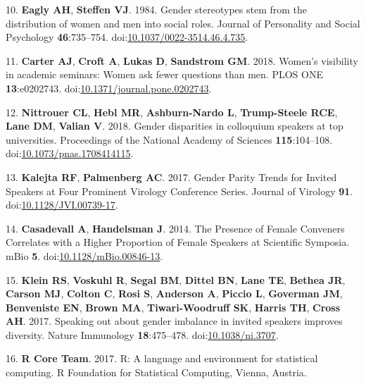 \documentclass[10pt,]{article}
\begin{document}
\hypertarget{ref-Eagly1984}{}
10. \textbf{Eagly AH}, \textbf{Steffen VJ}. 1984. Gender stereotypes
stem from the distribution of women and men into social roles. Journal
of Personality and Social Psychology \textbf{46}:735--754.
doi:\href{https://doi.org/10.1037/0022-3514.46.4.735}{10.1037/0022-3514.46.4.735}.

\hypertarget{ref-Carter2018}{}
11. \textbf{Carter AJ}, \textbf{Croft A}, \textbf{Lukas D},
\textbf{Sandstrom GM}. 2018. Women's visibility in academic seminars:
Women ask fewer questions than men. PLOS ONE \textbf{13}:e0202743.
doi:\href{https://doi.org/10.1371/journal.pone.0202743}{10.1371/journal.pone.0202743}.

\hypertarget{ref-nittrouer_gender_2018}{}
12. \textbf{Nittrouer CL}, \textbf{Hebl MR}, \textbf{Ashburn-Nardo L},
\textbf{Trump-Steele RCE}, \textbf{Lane DM}, \textbf{Valian V}. 2018.
Gender disparities in colloquium speakers at top universities.
Proceedings of the National Academy of Sciences \textbf{115}:104--108.
doi:\href{https://doi.org/10.1073/pnas.1708414115}{10.1073/pnas.1708414115}.

\hypertarget{ref-kalejta_gender_2017}{}
13. \textbf{Kalejta RF}, \textbf{Palmenberg AC}. 2017. Gender Parity
Trends for Invited Speakers at Four Prominent Virology Conference
Series. Journal of Virology \textbf{91}.
doi:\href{https://doi.org/10.1128/JVI.00739-17}{10.1128/JVI.00739-17}.

\hypertarget{ref-casadevall_presence_2014}{}
14. \textbf{Casadevall A}, \textbf{Handelsman J}. 2014. The Presence of
Female Conveners Correlates with a Higher Proportion of Female Speakers
at Scientific Symposia. mBio \textbf{5}.
doi:\href{https://doi.org/10.1128/mBio.00846-13}{10.1128/mBio.00846-13}.

\hypertarget{ref-klein_speaking_2017}{}
15. \textbf{Klein RS}, \textbf{Voskuhl R}, \textbf{Segal BM},
\textbf{Dittel BN}, \textbf{Lane TE}, \textbf{Bethea JR}, \textbf{Carson
MJ}, \textbf{Colton C}, \textbf{Rosi S}, \textbf{Anderson A},
\textbf{Piccio L}, \textbf{Goverman JM}, \textbf{Benveniste EN},
\textbf{Brown MA}, \textbf{Tiwari-Woodruff SK}, \textbf{Harris TH},
\textbf{Cross AH}. 2017. Speaking out about gender imbalance in invited
speakers improves diversity. Nature Immunology \textbf{18}:475--478.
doi:\href{https://doi.org/10.1038/ni.3707}{10.1038/ni.3707}.

\hypertarget{ref-R_software_2017}{}
16. \textbf{R Core Team}. 2017. R: A language and environment for
statistical computing. R Foundation for Statistical Computing, Vienna,
Austria.
\end{document}
